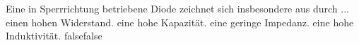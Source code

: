     {Eine in Sperrrichtung betriebene Diode zeichnet sich insbesondere aus durch ...}
    {einen hohen Widerstand.}
    {eine hohe Kapazität.}
    {eine geringe Impedanz.}
    {eine hohe Induktivität.}
    {false}{false}